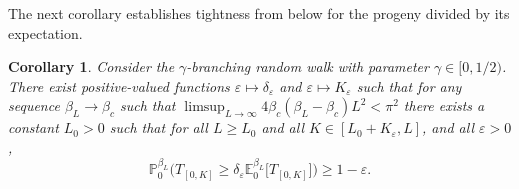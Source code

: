 \documentclass[a4paper, a4wide, 10pt, reqno]{amsart}
\theoremstyle{plain}
\newtheorem{corollary}[theorem]{Corollary}
\theoremstyle{definition}
\numberwithin{equation}{section}
\newcommand{\E}{\mathbb E}
\newcommand{\Prob}{\mathbb{P}}
\newcommand\eps{\varepsilon}
\begin{document}
The next corollary establishes tightness from below for the progeny divided by its expectation. 
\begin{corollary}\label{cor:brw-progeny}
    Consider the $\gamma$-branching random walk with parameter $\gamma\in[0,1/2)$. There exist positive-valued functions $\varepsilon\mapsto\delta_\varepsilon$ and $\varepsilon\mapsto K_\varepsilon$ such that for any sequence $\beta_L\to\beta_c$ such that $\limsup_{L\to\infty}4\beta_c(\beta_L-\beta_c) L^2<\pi^2$ there exists a constant $L_0>0$ such that for all $L\ge L_0$ and all $K\in[L_0+K_\eps, L]$, and all $\varepsilon>0$, 
\begin{equation}\label{eq:progeny-early}
\Prob_0^{\beta_L}\Big(T_{[0, K]}\ge \delta_\varepsilon\E_0^{\beta_L}\big[T_{[0, K]}\big]\Big) \ge 1-\varepsilon.
\end{equation}
\end{corollary}
\end{document}

